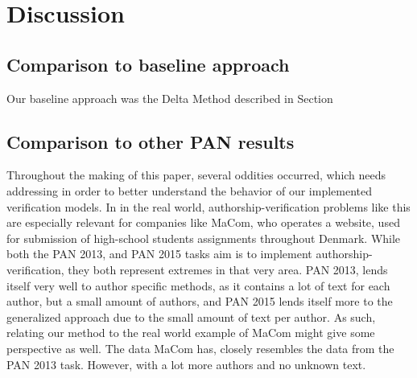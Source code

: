 \section{Discussion} \label{sec:discussion}

\subsection{Comparison to baseline approach}
Our baseline approach was the Delta Method described in Section 

\subsection{Comparison to other PAN results}

Throughout the making of this paper, several oddities occurred, which needs
addressing in order to better understand the behavior of our implemented
verification models. In in the real world, authorship-verification problems
like this are especially relevant for companies like MaCom, who operates a
website, used for submission of high-school students assignments throughout
Denmark. While both the PAN 2013, and PAN 2015 tasks aim is to implement
authorship-verification, they both represent extremes in that very area. PAN
2013, lends itself very well to author specific methods, as it contains a lot of
text for each author, but a small amount of authors, and PAN 2015 lends itself
more to the generalized approach due to the small amount of text per author. As
such, relating our method to the real world example of MaCom might give some
perspective as well. The data MaCom has, closely resembles the data from the PAN
2013 task. However, with a lot more authors and no unknown text.

